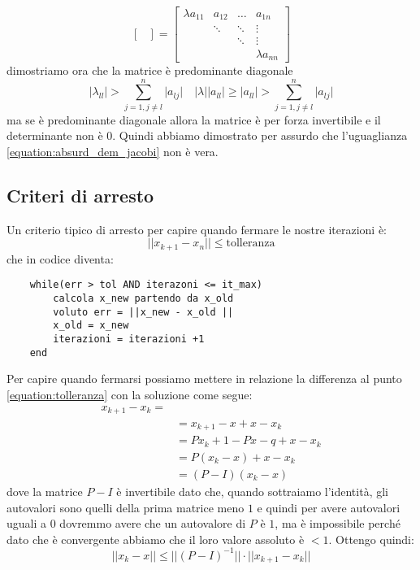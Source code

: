 \begin{demostration}
\begin{itemize}
\begin{equation*}
\begin{bmatrix}
			\end{bmatrix} = 
			\begin{bmatrix}
				\lambda a_{11} & a_{12} & \ldots & a_{1n} \\
				& \ddots & \ddots  & \vdots \\
				&  & \ddots & \vdots \\
				& & & \lambda a_{nn}
				
			\end{bmatrix}
		\end{equation*}
		dimostriamo ora che la matrice è predominante diagonale
		\begin{equation*}
			\lvert \lambda_{ll} \rvert > \sum_{j=1, j\neq l}^{n} \lvert a_{lj} \rvert \quad \lvert \lambda \lvert \lvert a_{ll} \rvert \geq \lvert a_{ll} \rvert > \sum_{j=1, j \neq l}^{n} \lvert a_{lj} \rvert
		\end{equation*}
		ma se è predominante diagonale allora la matrice è per forza invertibile e il determinante non è 0. Quindi abbiamo dimostrato per assurdo che l'uguaglianza \ref{equation:absurd_dem_jacobi} non è vera.
	\end{itemize}
\end{demostration}

\subsection{Criteri di arresto}
Un criterio tipico di arresto per capire quando fermare le nostre iterazioni è:
\begin{equation}
	\label{equation:tolleranza}
	\lvert \lvert x_{k+1} - x_n \rvert \rvert \leq \text{tolleranza}
\end{equation}
che in codice diventa:
\begin{lstlisting}
	while(err > tol AND iterazoni <= it_max)
		calcola x_new partendo da x_old
		voluto err = ||x_new - x_old ||
		x_old = x_new
		iterazioni = iterazioni +1
	end
\end{lstlisting}
Per capire quando fermarsi possiamo mettere in relazione la differenza al punto \ref{equation:tolleranza} con la soluzione come segue:
\begin{equation*}
	\begin{split}
		x_{k+1}-x_k = \\
		& = x_{k+1}-x+x-x_k \\
		& = Px_k+1-Px-q+x-x_k \\
		& =P(x_k-x)+x-x_k \\
		&= (P-I)(x_k-x)
	\end{split}
\end{equation*}
dove la matrice $P-I$ è invertibile dato che, quando sottraiamo l'identità, gli autovalori sono quelli della prima matrice meno $1$ e quindi per avere autovalori uguali a $0$ dovremmo avere che un autovalore di $P$ è $1$, ma è impossibile perché dato che è convergente abbiamo che il loro valore assoluto è $<1$. Ottengo quindi:
\begin{equation}
	\lvert\lvert x_k - x \rvert\rvert \leq \lvert\lvert (P-I)^{-1}\rvert\rvert \cdot \lvert\lvert x_{k+1}-x_{k}\rvert\rvert
\end{equation}

